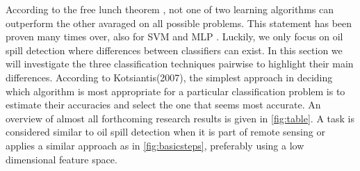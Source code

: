  
According to the free lunch theorem \cite{wolpert1995no}, not one of two learning algorithms can outperform the other avaraged on all possible problems. This statement has been proven many times over, also for SVM and MLP \cite{Moavenian20103088,Zanaty2012177,jin2005neural}. Luckily, we only focus on oil spill detection where differences between classifiers can exist. In this section we will investigate the three classification techniques pairwise to highlight their main differences. According to Kotsiantis(2007), the simplest approach in deciding which algorithm is most appropriate for a particular classification problem is to estimate their accuracies and select the one that seems most accurate\cite{kotsiantis2007supervised}. An overview of almost all forthcoming research results is given in \ref{fig:table}. A task is considered similar to oil spill detection when it is part of remote sensing or applies a similar approach as in \ref{fig:basicsteps}, preferably using a low dimensional feature space.